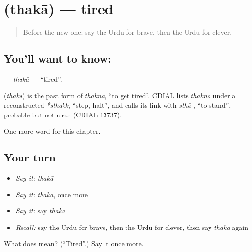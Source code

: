 \section[\texorpdfstring{\ur{تھکا} (thakā)}{تھکا (thakā)}]{ (thakā) — tired}

\label{lesson:UR-C135-thaka}



\begin{quote}
Before the new one: say the Urdu for brave, then the Urdu for clever.
\end{quote}

\subsection*{You'll want to know: }
\textbf{} — \emph{thakā} — \textquotedblleft{}tired\textquotedblright{}.

\begin{cousinweb}
\textbf{} (\emph{thakā}) is the past form of \emph{thaknā}, \textquotedblleft{}to get tired\textquotedblright{}. CDIAL lists \emph{thaknā} under a reconstructed \emph{*sthakk}, \textquotedblleft{}stop, halt\textquotedblright{}, and calls its link with \emph{sthā-}, \textquotedblleft{}to stand\textquotedblright{}, probable but not clear (CDIAL 13737).
\end{cousinweb}

\begin{grammarlens}[title={What you've built}]
One more word for this chapter.
\end{grammarlens}

\subsection*{Your turn}
\begin{itemize}
\raggedright
  \item \emph{Say it:} \emph{thakā}
  \item \emph{Say it:} \emph{thakā}, once more
  \item \emph{Say it:} say \emph{thakā}
  \item \emph{Recall:} say the Urdu for brave, then the Urdu for clever, then say \emph{thakā} again
\end{itemize}

\begin{tcolorbox}[breakable,colback=teal!4,colframe=teal!35!black,title={Before you move on}]
What does  mean? (\textquotedblleft{}Tired\textquotedblright{}.) Say it once more.
\end{tcolorbox}
